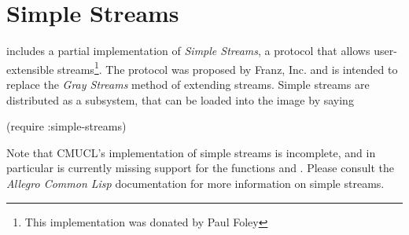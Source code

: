 \section{Simple Streams}
\label{simple-streams}

\cmucl{} includes a partial implementation of \emph{Simple Streams}, a
protocol that allows user-extensible streams\footnote{This
implementation was donated by Paul Foley}. The protocol was proposed
by Franz, Inc. and is intended to replace the \emph{Gray Streams}
method of extending streams. Simple streams are distributed as a
\cmucl{} subsystem, that can be loaded into the image by saying

\begin{lisp}
   (require :simple-streams)
\end{lisp}

Note that CMUCL's implementation of simple streams is incomplete, and
in particular is currently missing support for the functions
 and . Please consult the
\textit{Allegro Common Lisp} documentation for more information on
simple streams.

